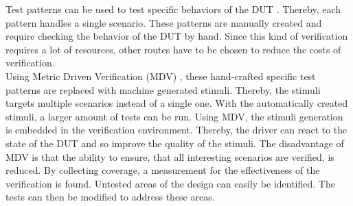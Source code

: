 Test patterns can be used to test specific behaviors of the DUT \cite{uvm_e}. Thereby, each pattern handles a single scenario.
These patterns are manually created and require checking the behavior of the DUT by hand.
Since this kind of verification requires a lot of resources, other routes have to be chosen to reduce the costs of verification.\\
Using Metric Driven Verification (MDV) \cite{fv}, these hand-crafted specific test patterns are replaced with machine generated stimuli.
Thereby, the stimuli targets multiple scenarios instead of a single one.
With the automatically created stimuli, a larger amount of tests can be run.
Using MDV, the stimuli generation is embedded in the verification environment. Thereby, the driver can react to the state of the DUT and so improve the quality
of the stimuli.
The disadvantage of MDV is that the ability to ensure, that all interesting scenarios are verified, is reduced.
By collecting coverage, a measurement for the effectiveness of the verification is found.
Untested areas of the design can easily be identified.
The tests can then be modified to address these areas.
